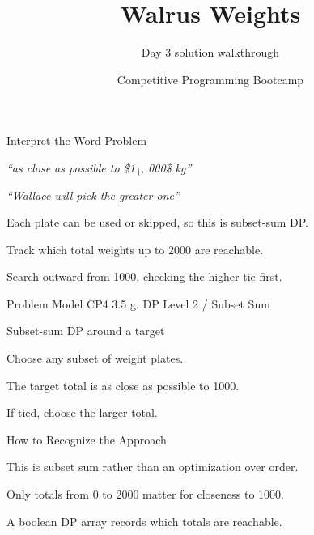\documentclass[aspectratio=169,11pt]{beamer}
\title[walrusweights]{Walrus Weights}
\subtitle{Day 3 solution walkthrough}
\author[Solution Deck]{Competitive Programming Bootcamp}
\date{}
\begin{document}
\begin{frame}[plain]
  \titlepage
\end{frame}

\begin{frame}{Interpret the Word Problem}
\small
{}
\begin{tightitemize}
  \item \textit{``as close as possible to \$1\textbackslash{}, 000\$ kg''}
  \item \textit{``Wallace will pick the greater one''}
\end{tightitemize}

\vspace{0.18cm}
\begin{tightitemize}
  \item Each plate can be used or skipped, so this is subset-sum DP.
  \item Track which total weights up to 2000 are reachable.
  \item Search outward from 1000, checking the higher tie first.
\end{tightitemize}
\end{frame}







\begin{frame}{Problem Model}
\small
{} CP4 3.5 g. DP Level 2 / Subset Sum

\vspace{0.25cm}
 Subset-sum DP around a target

\vspace{0.25cm}
\begin{tightitemize}
  \item Choose any subset of weight plates.
  \item The target total is as close as possible to 1000.
  \item If tied, choose the larger total.
\end{tightitemize}
\end{frame}

\begin{frame}{How to Recognize the Approach}
\begin{tightitemize}
  \item This is subset sum rather than an optimization over order.
  \item Only totals from 0 to 2000 matter for closeness to 1000.
  \item A boolean DP array records which totals are reachable.
\end{tightitemize}
\end{frame}
\end{document}
